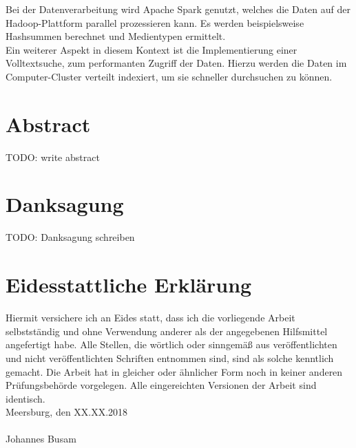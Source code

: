 \noindent
Bei der Datenverarbeitung wird Apache Spark genutzt, welches die Daten auf der Hadoop-Plattform parallel prozessieren kann. Es werden beispielsweise Hashsummen berechnet und Medientypen ermittelt.\\
Ein weiterer Aspekt in diesem Kontext ist die Implementierung einer Volltextsuche, zum performanten Zugriff der Daten. Hierzu werden die Daten im Computer-Cluster verteilt indexiert, um sie schneller durchsuchen zu können.\\

\noindent



\newpage
\section*{Abstract}
TODO: write abstract
\newpage

\section*{Danksagung}
TODO: Danksagung schreiben
\newpage

\section*{Eidesstattliche Erklärung}

Hiermit versichere ich an Eides statt, dass ich die vorliegende Arbeit selbstständig und
ohne Verwendung anderer als der angegebenen Hilfsmittel angefertigt habe. Alle Stellen,
die wörtlich oder sinngemäß aus veröffentlichten und nicht veröffentlichten Schriften
entnommen sind, sind als solche kenntlich gemacht. Die Arbeit hat in gleicher oder
ähnlicher Form noch in keiner anderen Prüfungsbehörde vorgelegen. Alle eingereichten
Versionen der Arbeit sind identisch.\\
\newline
\noindent
Meersburg, den XX.XX.2018 \\
\vspace{1.5cm} \\
Johannes Busam\newline

\newpage
